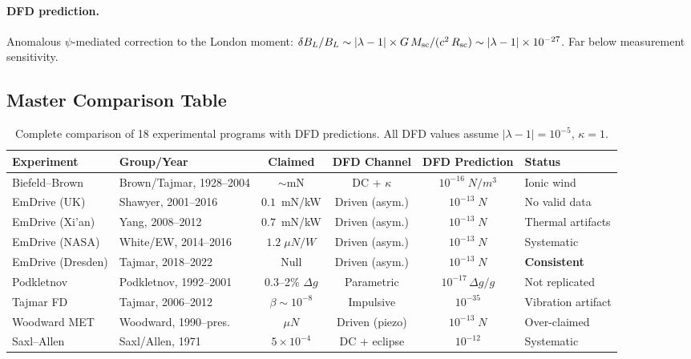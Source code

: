 \documentclass[aps,prd,twocolumn,superscriptaddress,floatfix,nofootinbib]{revtex4-2}
\newcommand{\lam}{\lambda}
\newcommand{\kap}{\kappa}
\begin{document}
\paragraph{DFD prediction.}
Anomalous $\psi$-mediated correction to the London moment:
$\delta B_L/B_L \sim |\lam-1| \times G\,M_{\rm sc}/(c^2\,R_{\rm sc})
\sim |\lam-1| \times 10^{-27}$. Far below measurement sensitivity.

\subsection{Master Comparison Table}\label{sec:master-table}

\begin{table}[t]
\caption{Complete comparison of 18 experimental programs with DFD
predictions. All DFD values assume $|\lam-1| = 10^{-5}$,
$\kap = 1$.}
\label{tab:master-comparison}
\begin{ruledtabular}
\begin{tabular}{llcccl}
Experiment & Group/Year & Claimed & DFD Channel &
DFD Prediction & Status \\
\hline
Biefeld--Brown & Brown/Tajmar, 1928--2004 &
$\sim$mN & DC + $\kap$ &
$10^{-16}\;\si{N/m^3}$ & Ionic wind \\
EmDrive (UK) & Shawyer, 2001--2016 &
$0.1$~mN/kW & Driven (asym.) &
$10^{-13}\;\si{N}$ & No valid data \\
EmDrive (Xi'an) & Yang, 2008--2012 &
$0.7$~mN/kW & Driven (asym.) &
$10^{-13}\;\si{N}$ & Thermal artifacts \\
EmDrive (NASA) & White/EW, 2014--2016 &
$1.2\;\si{\mu N/W}$ & Driven (asym.) &
$10^{-13}\;\si{N}$ & Systematic \\
EmDrive (Dresden) & Tajmar, 2018--2022 &
Null & Driven (asym.) &
$10^{-13}\;\si{N}$ & \textbf{Consistent} \\
Podkletnov & Podkletnov, 1992--2001 &
0.3--2\% $\Delta g$ & Parametric &
$10^{-17}\,\Delta g/g$ & Not replicated \\
Tajmar FD & Tajmar, 2006--2012 &
$\beta \sim 10^{-8}$ & Impulsive &
$10^{-35}$ & Vibration artifact \\
Woodward MET & Woodward, 1990--pres. &
$\si{\mu N}$ & Driven (piezo) &
$10^{-13}\;\si{N}$ & Over-claimed \\
Saxl--Allen & Saxl/Allen, 1971 &
$5\times10^{-4}$ & DC + eclipse &
$10^{-12}$ & Systematic \\

\end{tabular}
\end{ruledtabular}
\end{table}
\end{document}

